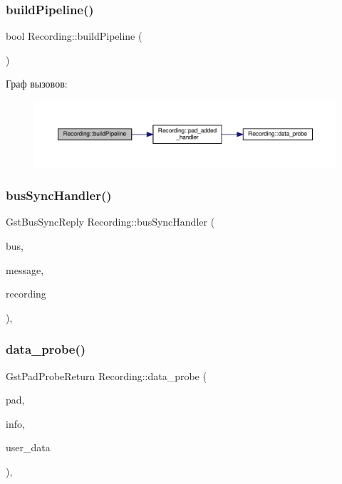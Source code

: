 \subsubsection{\texorpdfstring{build\+Pipeline()}{buildPipeline()}}
{\footnotesize\ttfamily bool Recording\+::build\+Pipeline (\begin{DoxyParamCaption}{ }\end{DoxyParamCaption})\hspace{0.3cm}{\ttfamily [private]}}

Граф вызовов\+:\nopagebreak
\begin{figure}[H]
\begin{center}
\leavevmode
\includegraphics[width=350pt]{class_recording_a6fcee36a2d8276d6b7bc111800f41c49_cgraph}
\end{center}
\end{figure}
\mbox{\label{class_recording_a902cb9d3bacaaf992e38427bbe63319b}} 
\subsubsection{\texorpdfstring{bus\+Sync\+Handler()}{busSyncHandler()}}
{\footnotesize\ttfamily Gst\+Bus\+Sync\+Reply Recording\+::bus\+Sync\+Handler (\begin{DoxyParamCaption}\item[{Gst\+Bus $\ast$}]{bus,  }\item[{Gst\+Message $\ast$}]{message,  }\item[{\hyperlink{class_recording}{Recording} $\ast$}]{recording }\end{DoxyParamCaption})\hspace{0.3cm}{\ttfamily [static]}, {\ttfamily [private]}}

\mbox{\label{class_recording_aaff0d133af8cc8bc3f514b7ae85fc99a}} 
\subsubsection{\texorpdfstring{data\+\_\+probe()}{data\_probe()}}
{\footnotesize\ttfamily Gst\+Pad\+Probe\+Return Recording\+::data\+\_\+probe (\begin{DoxyParamCaption}\item[{Gst\+Pad $\ast$}]{pad,  }\item[{Gst\+Pad\+Probe\+Info $\ast$}]{info,  }\item[{gpointer}]{user\+\_\+data }\end{DoxyParamCaption})\hspace{0.3cm}{\ttfamily [static]}, {\ttfamily [private]}}

